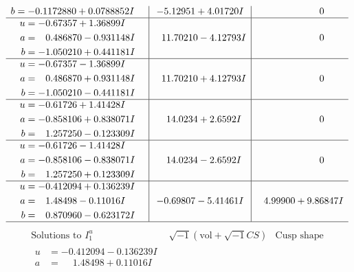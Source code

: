 \documentclass[1p]{elsarticle_modified}
\theoremstyle{definition}
\newcommand{\I}{\sqrt{-1}}
\begin{document}
$$\begin{array}{c|c|c}
\begin{aligned}
b &= -0.1172880 + 0.0788852 I\end{aligned}
 & -5.12951 + 4.01720 I & \phantom{-0.000000 } 0 \\ \hline\begin{aligned}
u &= -0.67357 + 1.36899 I \\
a &= \phantom{-}0.486870 - 0.931148 I \\
b &= -1.050210 + 0.441181 I\end{aligned}
 & \phantom{-}11.70210 - 4.12793 I & \phantom{-0.000000 } 0 \\ \hline\begin{aligned}
u &= -0.67357 - 1.36899 I \\
a &= \phantom{-}0.486870 + 0.931148 I \\
b &= -1.050210 - 0.441181 I\end{aligned}
 & \phantom{-}11.70210 + 4.12793 I & \phantom{-0.000000 } 0 \\ \hline\begin{aligned}
u &= -0.61726 + 1.41428 I \\
a &= -0.858106 + 0.838071 I \\
b &= \phantom{-}1.257250 - 0.123309 I\end{aligned}
 & \phantom{-}14.0234 + 2.6592 I & \phantom{-0.000000 } 0 \\ \hline\begin{aligned}
u &= -0.61726 - 1.41428 I \\
a &= -0.858106 - 0.838071 I \\
b &= \phantom{-}1.257250 + 0.123309 I\end{aligned}
 & \phantom{-}14.0234 - 2.6592 I & \phantom{-0.000000 } 0 \\ \hline\begin{aligned}
u &= -0.412094 + 0.136239 I \\
a &= \phantom{-}1.48498 - 0.11016 I \\
b &= \phantom{-}0.870960 - 0.623172 I\end{aligned}
 & -0.69807 - 5.41461 I & \phantom{-}4.99900 + 9.86847 I\\
 \hline 
 \end{array}$$\newpage$$\begin{array}{c|c|c}  
\text{Solutions to }I^u_{1}& \I (\text{vol} + \sqrt{-1}CS) & \text{Cusp shape}\\
 \hline 
\begin{aligned}
u &= -0.412094 - 0.136239 I \\
a &= \phantom{-}1.48498 + 0.11016 I \\

\end{aligned}
\end{array}$$
\end{document}
